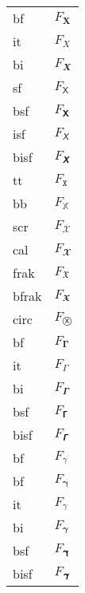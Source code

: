 \documentclass{unittest}
\begin{document}
\begin{tabular}{ll}
\\ bf    & $F_𝐗$
\\ it    & $F_𝑋$
\\ bi    & $F_𝑿$
\\ sf    & $F_𝖷$
\\ bsf   & $F_𝗫$
\\ isf   & $F_𝘟$
\\ bisf  & $F_𝙓$
\\ tt    & $F_𝚇$
\\ bb    & $F_𝕏$
\\ scr   & $F_𝒳$
\\ cal   & $F_𝓧$
\\ frak  & $F_𝔛$
\\ bfrak & $F_𝖃$
\\ circ  & $F_Ⓧ$
\\ bf    & $F_𝚪$
\\ it    & $F_𝛤$
\\ bi    & $F_𝜞$
\\ bsf   & $F_𝝘$
\\ bisf  & $F_𝞒$
\\ bf    & $F_γ$
\\ bf    & $F_𝛄$
\\ it    & $F_𝛾$
\\ bi    & $F_𝜸$
\\ bsf   & $F_𝝲$
\\ bisf  & $F_𝞬$
\end{tabular}
\end{document}
